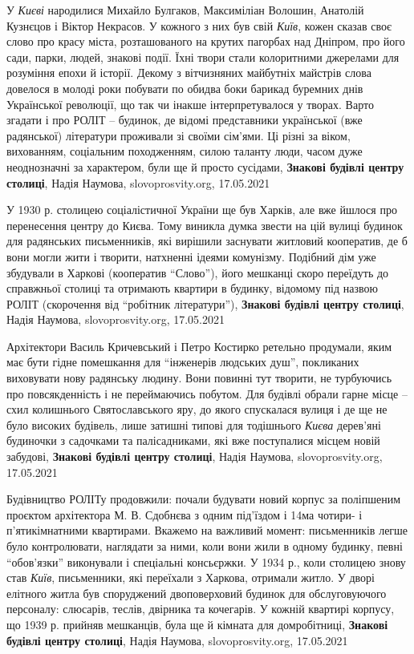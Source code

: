 У \emph{Києві} народилися Михайло Булгаков, Максиміліан Волошин, Анатолій Кузнєцов і
Віктор Некрасов. У кожного з них був свій \emph{Київ}, кожен сказав своє слово про
красу міста, розташованого на крутих пагорбах над Дніпром, про його сади,
парки, людей, знакові події. Їхні твори стали колоритними джерелами для
розуміння епохи й історії. Декому з вітчизняних майбутніх майстрів слова
довелося в молоді роки побувати по обидва боки барикад буремних днів
Української революції, що так чи інакше інтерпретувалося у творах.  Варто
згадати і про РОЛІТ – будинок, де відомі представники української (вже
радянської) літератури проживали зі своїми сім'ями. Ці різні за віком,
вихованням, соціальним походженням, силою таланту люди, часом дуже неоднозначні
за характером, були ще й просто сусідами,
\textbf{Знакові будівлі центру столиці}, Надія Наумова, slovoprosvity.org, 17.05.2021

У 1930 р. столицею соціалістичної України ще був Харків, але вже йшлося про
перенесення центру до Києва. Тому виникла думка звести на цій вулиці будинок
для радянських письменників, які вирішили заснувати житловий кооператив, де б
вони могли жити і творити, натхненні ідеями комунізму. Подібний дім уже
збудували в Харкові (кооператив \enquote{Слово}), його мешканці скоро переїдуть до
справжньої столиці та отримають квартири в будинку, відомому під назвою РОЛІТ
(скорочення від \enquote{робітник літератури}),
\textbf{Знакові будівлі центру столиці}, Надія Наумова, slovoprosvity.org, 17.05.2021

Архітектори Василь Кричевський і Петро Костирко ретельно продумали, яким має
бути гідне помешкання для \enquote{інженерів людських душ}, покликаних виховувати нову
радянську людину. Вони повинні тут творити, не турбуючись про повсякденність і
не переймаючись побутом. Для будівлі обрали гарне місце – схил колишнього
Святославського яру, до якого спускалася вулиця і де ще не було високих
будівель, лише затишні типові для тодішнього \emph{Києва} дерев'яні будиночки з
садочками та палісадниками, які вже поступалися місцем новій забудові,
\textbf{Знакові будівлі центру столиці}, Надія Наумова, slovoprosvity.org, 17.05.2021

Будівництво РОЛІТу продовжили: почали будувати новий корпус за поліпшеним
проєктом архітектора М. В. Сдобнєва з одним під'їздом і 14ма чотири- і
п'ятикімнатними квартирами.  Вкажемо на важливий момент: письменників легше
було контролювати, наглядати за ними, коли вони жили в одному будинку, певні
\enquote{обов'язки} виконували і спеціальні консьєржки.  У 1934 р., коли
столицею знову став \emph{Київ}, письменники, які переїхали з Харкова, отримали
житло. У дворі елітного житла був споруджений двоповерховий будинок для
обслуговуючого персоналу: слюсарів, теслів, двірника та кочегарів. У кожній
квартирі корпусу, що 1939 р. прийняв мешканців, була ще й кімната для
домробітниці,
\textbf{Знакові будівлі центру столиці}, Надія Наумова, slovoprosvity.org, 17.05.2021

